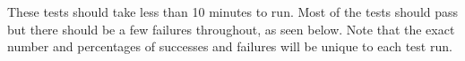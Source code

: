 \documentclass{csse4400}
\begin{document}
These tests should take less than 10 minutes to run.
Most of the tests should pass but there should be a few failures throughout, as seen below.
Note that the exact number and percentages of successes and failures will be unique to each test run.
%
%
%
%
%
\end{document}
